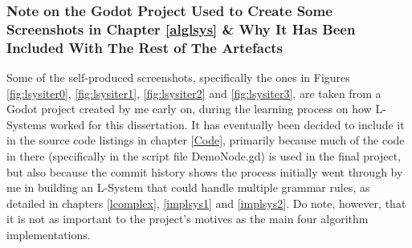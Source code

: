 \subsubsection{Note on the Godot Project Used to Create Some Screenshots in Chapter \ref{alglsys} \& Why It Has Been Included With The Rest of The Artefacts}

Some of the self-produced screenshots, specifically the ones in Figures \ref{fig:lsysiter0}, \ref{fig:lsysiter1}, \ref{fig:lsysiter2} and \ref{fig:lsysiter3}, are taken from a Godot project created by me early on, during the learning process on how L-Systems worked for this dissertation. It has eventually been decided to include it in the source code listings in chapter \ref{Code}, primarily because much of the code in there (specifically in the script file DemoNode.gd) is used in the final project, but also because the commit history shows the process initially went through by me in building an L-System that could handle multiple grammar rules, as detailed in chapters \ref{lcomplex}, \ref{implsys1} and \ref{implsys2}. Do note, however, that it is not as important to the project's motives as the main four algorithm implementations. 